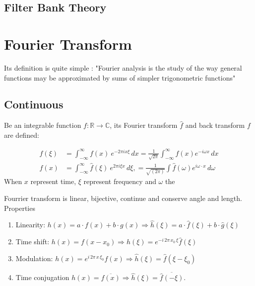 \documentclass[twocolumn]{article}
\numberwithin{equation}{section}
\begin{document}
	\subsection{Filter Bank Theory}
	
	

\newpage
\section{Fourier Transform}
Its definition is quite simple : "Fourier analysis is the study of the way general functions may be approximated by sums of simpler trigonometric functions"
	
	\subsection{Continuous} 
\begin{framed}
Be an integrable function $f : \mathbb R \rightarrow \mathbb C$, its Fourier transform $\hat{f}$ and back transform $f$ are defined:

\begin{align*}
\hat{f}(\xi) &= \int_{-\infty}^\infty f(x)\ e^{- 2\pi i x \xi}\,dx= 
\frac{1}{\sqrt{2 \pi}} \int_{-\infty}^{\infty} f(x) e^{-i \omega x}\, dx \\
f(x) &= \int_{-\infty}^\infty \hat f(\xi)\ e^{2 \pi i \xi x}\,d\xi, = \frac{1}{\sqrt{(2 \pi)}} \int \hat{f}
(\omega)e^{i \omega\cdot x}\, d\omega
\end{align*}
When $x$ represent time, $\xi$ represent frequency and $\omega$ the 
\end{framed}

Fourrier transform is linear, bijective, continue and conserve angle and length. 
Properties
\begin{enumerate}
\item Linearity: $h(x)=a\cdot f(x) + b\cdot g(x) \Rightarrow \hat{h}(\xi)=a\cdot \hat{f}(\xi) + b\cdot\hat{g}(\xi)$
\item Time shift: $h(x)=f(x-x_0) \Rightarrow \hat{h}(\xi)= e^{-i\,2\pi \,x_0\,\xi }\hat{f}(\xi)$
\item Modulation:  $h(x)=e^{i \, 2\pi \, x \,\xi_0}f(x)\Rightarrow  \hat{h}(\xi) = \hat{f}(\xi-\xi_{0})$
\item Time conjugation $h(x)=\overline{f(x)}\Rightarrow  \hat{h}(\xi) = \overline{\hat{f}(-\xi)}.$
\end{enumerate}
\end{document}
